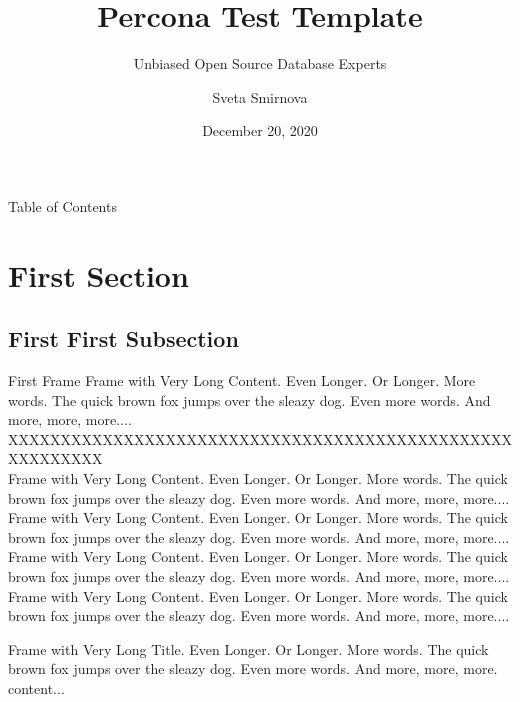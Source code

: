 \documentclass[aspectratio=169]{beamer}
\title[Test]{Percona Test Template}
\subtitle{Unbiased Open Source Database Experts}
\author{Sveta Smirnova}
\institute{Percona}
\date{December 20, 2020}
\begin{document}
	
\begin{frame}
	\titlepage
\end{frame}

\begin{frame}{Table of Contents}
	\vfill
	\tableofcontents
\end{frame}

\section{First Section}

\subsection{First First Subsection}

\begin{frame}{First Frame}
	Frame with Very Long Content. Even Longer. Or Longer. More words. The quick brown fox jumps over the sleazy dog. Even more words. And more, more, more....\\
	XXXXXXXXXXXXXXXXXXXXXXXXXXXXXXXXXXXXXXXXXXXXXXXXXXXXXXXXX \\
	Frame with Very Long Content. Even Longer. Or Longer. More words. The quick brown fox jumps over the sleazy dog. Even more words. And more, more, more....\\
	Frame with Very Long Content. Even Longer. Or Longer. More words. The quick brown fox jumps over the sleazy dog. Even more words. And more, more, more....\\
	Frame with Very Long Content. Even Longer. Or Longer. More words. The quick brown fox jumps over the sleazy dog. Even more words. And more, more, more....\\
	Frame with Very Long Content. Even Longer. Or Longer. More words. The quick brown fox jumps over the sleazy dog. Even more words. And more, more, more....\\
\end{frame}

\begin{frame}{\small{Frame with Very Long Title. Even Longer. Or Longer. More words. The quick brown fox jumps over the sleazy dog. Even more words. And more, more, more.}}
	content...
\end{frame}
\end{document}
